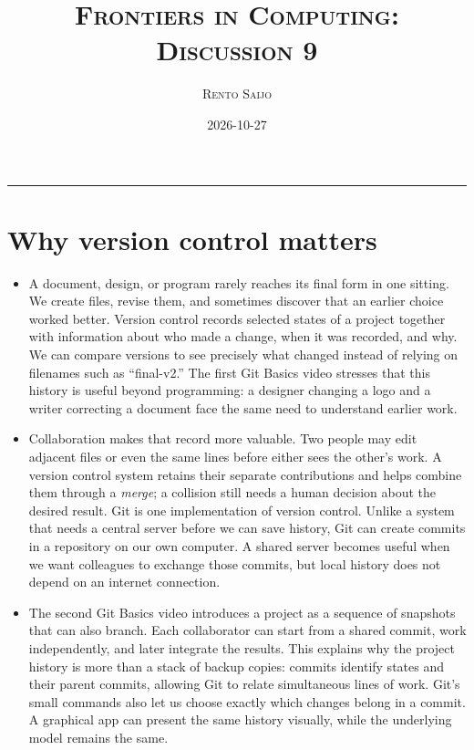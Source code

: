 \documentclass[10pt]{article}
\title{\Large\textsc{Frontiers in Computing: Discussion 9}}
\author{\large\textsc{Rento Saijo}}
\date{2026-10-27}
\begin{document}
\maketitle
\thispagestyle{fancy}
\vspace{-1em}\rule{\linewidth}{0.6pt}\vspace{0.5em}

\section*{Why version control matters}

\begin{itemize}[leftmargin=1.25em, itemsep=0.3em, parsep=0pt, topsep=0pt]
    \item A document, design, or program rarely reaches its final form in one sitting. We create files, revise them, and sometimes discover that an earlier choice worked better. Version control records selected states of a project together with information about who made a change, when it was recorded, and why. We can compare versions to see precisely what changed instead of relying on filenames such as ``final-v2.'' The first Git Basics video stresses that this history is useful beyond programming: a designer changing a logo and a writer correcting a document face the same need to understand earlier work.

    \item Collaboration makes that record more valuable. Two people may edit adjacent files or even the same lines before either sees the other's work. A version control system retains their separate contributions and helps combine them through a \emph{merge}; a collision still needs a human decision about the desired result. Git is one implementation of version control. Unlike a system that needs a central server before we can save history, Git can create commits in a repository on our own computer. A shared server becomes useful when we want colleagues to exchange those commits, but local history does not depend on an internet connection.

    \item The second Git Basics video introduces a project as a sequence of snapshots that can also branch. Each collaborator can start from a shared commit, work independently, and later integrate the results. This explains why the project history is more than a stack of backup copies: commits identify states and their parent commits, allowing Git to relate simultaneous lines of work. Git's small commands also let us choose exactly which changes belong in a commit. A graphical app can present the same history visually, while the underlying model remains the same.


\end{itemize}
\end{document}
